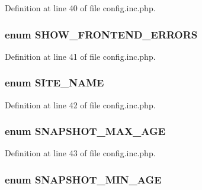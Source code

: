 Definition at line 40 of file config.inc.php.

\hypertarget{config_8inc_8php_a71022f94adb600e3984795805fe7f8d0}{
\subsubsection[{SHOW\_\-FRONTEND\_\-ERRORS}]{\setlength{\rightskip}{0pt plus 5cm}enum {\bf SHOW\_\-FRONTEND\_\-ERRORS}}}
\label{config_8inc_8php_a71022f94adb600e3984795805fe7f8d0}


Definition at line 41 of file config.inc.php.

\hypertarget{config_8inc_8php_a38f8e1265350d7091b55f4cffe629f3a}{
\subsubsection[{SITE\_\-NAME}]{\setlength{\rightskip}{0pt plus 5cm}enum {\bf SITE\_\-NAME}}}
\label{config_8inc_8php_a38f8e1265350d7091b55f4cffe629f3a}


Definition at line 42 of file config.inc.php.

\hypertarget{config_8inc_8php_aa9c8d739795b1000f6ea105992a4e488}{
\subsubsection[{SNAPSHOT\_\-MAX\_\-AGE}]{\setlength{\rightskip}{0pt plus 5cm}enum {\bf SNAPSHOT\_\-MAX\_\-AGE}}}
\label{config_8inc_8php_aa9c8d739795b1000f6ea105992a4e488}


Definition at line 43 of file config.inc.php.

\hypertarget{config_8inc_8php_a7fb94ff6aaa61e964fe2f90f738d5cb3}{
\subsubsection[{SNAPSHOT\_\-MIN\_\-AGE}]{\setlength{\rightskip}{0pt plus 5cm}enum {\bf SNAPSHOT\_\-MIN\_\-AGE}}}
\label{config_8inc_8php_a7fb94ff6aaa61e964fe2f90f738d5cb3}


